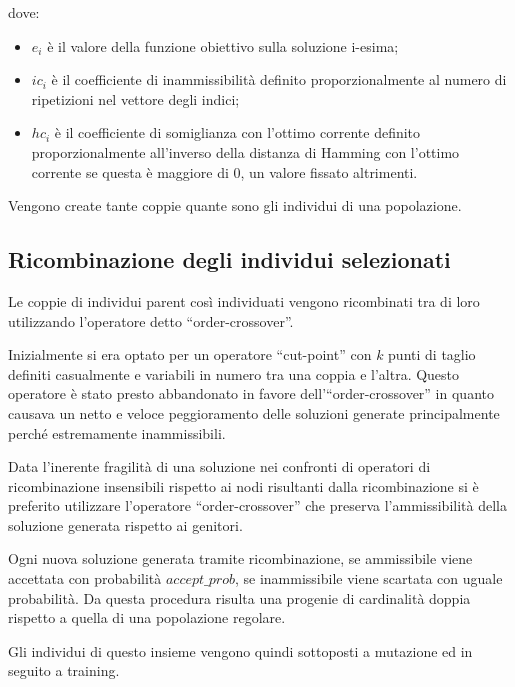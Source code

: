 \documentclass[a4paper]{article}
\begin{document}
            dove:
            \begin{itemize}
                \item $e_i$ \`e il valore della funzione obiettivo sulla soluzione i-esima;
                \item $ic_i$ \`e il coefficiente di inammissibilit\`a definito proporzionalmente
                    al numero di ripetizioni nel vettore degli indici;
                \item $hc_i$ \`e il coefficiente di somiglianza con l'ottimo corrente definito proporzionalmente
                    all'inverso della distanza di Hamming con l'ottimo corrente se questa \`e maggiore di 0, un valore
                    fissato altrimenti.
            \end{itemize}

            Vengono create tante coppie quante sono gli individui di una popolazione.
        
        \subsection{Ricombinazione degli individui selezionati}
            Le coppie di individui parent cos\`i individuati vengono ricombinati tra di loro utilizzando l'operatore detto
            ``order-crossover''.

            Inizialmente si era optato per un operatore ``cut-point'' con $k$ punti di taglio definiti casualmente e variabili
            in numero tra una coppia e l'altra.
            Questo operatore \`e stato presto abbandonato in favore dell'``order-crossover'' in quanto causava un netto e veloce
            peggioramento delle soluzioni generate principalmente perch\'e estremamente inammissibili.

            Data l'inerente fragilit\`a di una soluzione nei confronti di operatori di ricombinazione insensibili rispetto ai nodi
            risultanti dalla ricombinazione si \`e preferito utilizzare l'operatore ``order-crossover'' che preserva l'ammissibilit\`a
            della soluzione generata rispetto ai genitori.

            Ogni nuova soluzione generata tramite ricombinazione, se ammissibile viene accettata con probabilit\`a $accept\_prob$,
            se inammissibile viene scartata con uguale probabilit\`a.
            Da questa procedura risulta una progenie di cardinalit\`a doppia rispetto a quella di una popolazione regolare.

            Gli individui di questo insieme vengono quindi sottoposti a mutazione ed in seguito a training.
\end{document}

